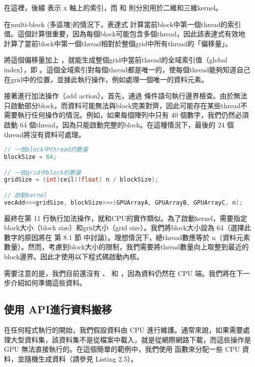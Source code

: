 在這裡，後綴  表示 x 軸上的索引，而  和  則分別用於二維和三維kernel。

在multi-block (多區塊)的情況下，表達式 計算當前block中第一個thread的索引值。這個計算很重要，因為每個block可能包含多個thread，因此該表達式有效地計算了當前block中第一個thread相對於整個grid中所有thread的「偏移量」。

將這個偏移量加上 ，就能生成整個grid中當前thread的全域索引值（global index），即 。這個全域索引對每個thread都是唯一的，使每個thread能夠知道自己在grid中的位置，並據此執行操作，例如處理一個唯一的資料元素。

接著進行加法操作（add action）。首先，通過  條件語句執行邊界檢查。由於無法只啟動部分block，而資料可能無法與block完美對齊，因此可能存在某些thread不需要執行任何操作的情況。例如，如果每個陣列中只有 40 個數字，我們仍然必須啟動 64 個thread，因為只能啟動完整的block。在這種情況下，最後的 24 個thread將沒有資料可處理。

\begin{lstlisting}[language=C, caption={管理thread與啟動kernel}, label={4th:example}]
// 一個block中thread的數量
blockSize = 64;

// 一個grid中block的數量
gridSize = (int)ceil((float) n / blockSize);

// 啟動kernel
vecAdd<<<gridSize, blockSize>>>(GPUArrayA, GPUArrayB, GPUArrayC, n);
\end{lstlisting}

最終在第 11 行執行加法操作，就和CPU的實作類似。為了啟動kernel，需要指定block大小（block size）和grid大小（grid size）。我們將block大小設為 64（選擇此數字的原因將在 第 8.1 節 中討論）。理想情況下，總thread數應等於 n（資料元素數量）。然而，考慮到block大小的限制，我們需要將thread數量向上取整到最近的block邊界。因此才使用以下程式碼啟動內核。

需要注意的是，我們目前還沒有 、 和 ，因為資料仍然在 CPU 端。我們將在下一步介紹如何準備這些資料。

\subsection{使用 API進行資料搬移}
在任何程式執行的開始，我們假設資料由 CPU 進行維護。通常來說，如果需要處理大型資料集，該資料集不是從檔案中載入，就是從網際網路下載，而這些操作是 GPU 無法直接執行的。在這個簡單的範例中，我們使用  函數來分配一些 CPU 資料，並隨機生成資料（請參見 Listing 2.5）。

